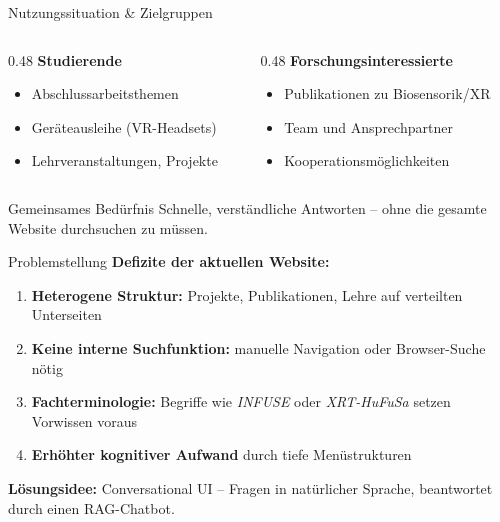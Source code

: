\documentclass[14pt,aspectratio=169]{beamer}
\begin{document}
\begin{frame}{Nutzungssituation \& Zielgruppen}
    \begin{columns}[T]
        \begin{column}{0.48\textwidth}
            \textbf{Studierende}
            \begin{itemize}
                \item Abschlussarbeitsthemen
                \item Geräteausleihe (VR-Headsets)
                \item Lehrveranstaltungen, Projekte
            \end{itemize}
        \end{column}
        \begin{column}{0.48\textwidth}
            \textbf{Forschungsinteressierte}
            \begin{itemize}
                \item Publikationen zu Biosensorik/XR
                \item Team und Ansprechpartner
                \item Kooperationsmöglichkeiten
            \end{itemize}
        \end{column}
    \end{columns}
    \vspace{0.5cm}
    \begin{alertblock}{Gemeinsames Bedürfnis}
        Schnelle, verständliche Antworten -- ohne die gesamte Website durchsuchen zu müssen.
    \end{alertblock}
\end{frame}

\begin{frame}{Problemstellung}
    \textbf{Defizite der aktuellen Website:}
    \begin{enumerate}
        \item \textbf{Heterogene Struktur:} Projekte, Publikationen, Lehre auf verteilten Unterseiten
        \item \textbf{Keine interne Suchfunktion:} manuelle Navigation oder Browser-Suche nötig
        \item \textbf{Fachterminologie:} Begriffe wie \textit{INFUSE} oder \textit{XRT-HuFuSa} setzen Vorwissen voraus
        \item \textbf{Erhöhter kognitiver Aufwand} durch tiefe Menüstrukturen
    \end{enumerate}
    \vspace{0.3cm}
    \textbf{Lösungsidee:} Conversational UI -- Fragen in natürlicher Sprache, beantwortet durch einen RAG-Chatbot.
\end{frame}
\end{document}

